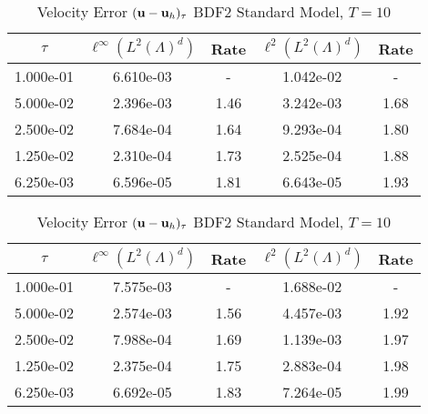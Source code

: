 \documentclass[letterpaper]{erdc}
\begin{document}
\begin{table}[h!]
  \parbox{.45\linewidth}{
  \tiny
  \centering
    \caption{Velocity Error $(\textbf{u} - \textbf{u}_h)_{\tau}$ BDF2 Rotational Model, $T=10$}
    \begin{tabular}{c|c|c|c|c}
      $\tau$ &  $\ell^{\infty}\left(L^2(\Lambda)^d\right)$ &  Rate  &  $\ell^2\left(L^2(\Lambda)^d\right)$  &  Rate\\
      \hline
      1.000e-01 & 6.610e-03 &   -  & 1.042e-02 &   - \\
      5.000e-02 & 2.396e-03 & 1.46 & 3.242e-03 & 1.68\\
      2.500e-02 & 7.684e-04 & 1.64 & 9.293e-04 & 1.80\\
      1.250e-02 & 2.310e-04 & 1.73 & 2.525e-04 & 1.88\\
      6.250e-03 & 6.596e-05 & 1.81 & 6.643e-05 & 1.93
    \end{tabular}
    }
    \hfill
    \parbox{.45\linewidth}{
    \tiny
    \centering
      \caption{Velocity Error $(\textbf{u} - \textbf{u}_h)_{\tau}$ BDF2 Standard Model, $T=10$}
      \begin{tabular}{c|c|c|c|c}
        $\tau$ &  $\ell^{\infty}\left(L^2(\Lambda)^d\right)$ &  Rate  &  $\ell^2\left(L^2(\Lambda)^d\right)$  &  Rate\\
        \hline
        1.000e-01 & 7.575e-03 &   -  & 1.688e-02 &   - \\
        5.000e-02 & 2.574e-03 & 1.56 & 4.457e-03 & 1.92\\
        2.500e-02 & 7.988e-04 & 1.69 & 1.139e-03 & 1.97\\
        1.250e-02 & 2.375e-04 & 1.75 & 2.883e-04 & 1.98\\
        6.250e-03 & 6.692e-05 & 1.83 & 7.264e-05 & 1.99
      \end{tabular}
    }
\end{table}
\end{document}
